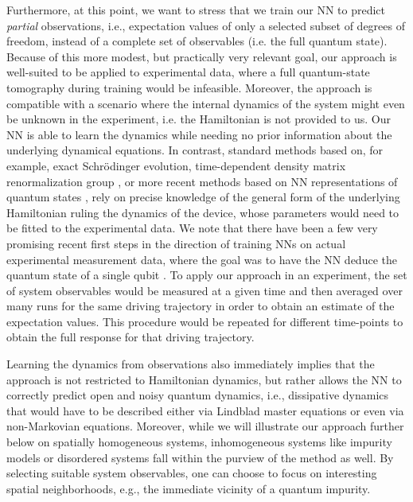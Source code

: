 \documentclass[a4paper,aps,amsmath,amssymb,twocolumn,longbibliography,,accepted=2022-05-17]{quantumarticle}
\begin{document}
Furthermore, at this point, we want to stress that we train our NN to predict \textit{partial} observations, i.e., expectation values of only a selected subset of degrees of freedom, instead of a complete set of observables (i.e. the full quantum state). Because of this more modest, but practically very relevant goal, our approach is well-suited to be applied to experimental data, where a full quantum-state tomography during training would be infeasible. Moreover, the approach is compatible with a scenario where the internal dynamics of the system might even be unknown in the experiment, i.e. the Hamiltonian is not provided to us. Our NN is able to learn the dynamics while needing no prior information about the underlying dynamical equations. In contrast, standard methods based on, for example, exact Schr\"odinger evolution, time-dependent density matrix renormalization group \cite{schollwock2011density}, or more recent methods based on NN representations of quantum states \cite{carleo2017solving, gao2017efficient, schmitt2019quantum}, rely on precise knowledge of the general form of the underlying Hamiltonian ruling the dynamics of the device, whose parameters would need to be fitted to the experimental data. We note that there have been a few very promising recent first steps in the direction of training NNs on actual experimental measurement data, where the goal was to have the NN deduce the quantum state of a single qubit \cite{struck2020robust, flurin2020using}. To apply our approach in an experiment, the set of system observables would be measured at a given time and then averaged over many runs for the same driving trajectory in order to obtain an estimate of the expectation values. This procedure would be repeated for different time-points to obtain the full response for that driving trajectory.

Learning the dynamics from observations also immediately implies that the approach is not restricted to Hamiltonian dynamics, but rather allows the NN to correctly predict open and noisy quantum dynamics, i.e., dissipative dynamics that would have to be described either via Lindblad master equations or even via non-Markovian equations. Moreover,  while we will illustrate our approach further below on spatially homogeneous systems, inhomogeneous systems like impurity models or disordered systems fall within the purview of the method as well. By selecting suitable system observables, one can choose to focus on interesting spatial neighborhoods, e.g., the immediate vicinity of a quantum impurity.
\end{document}
